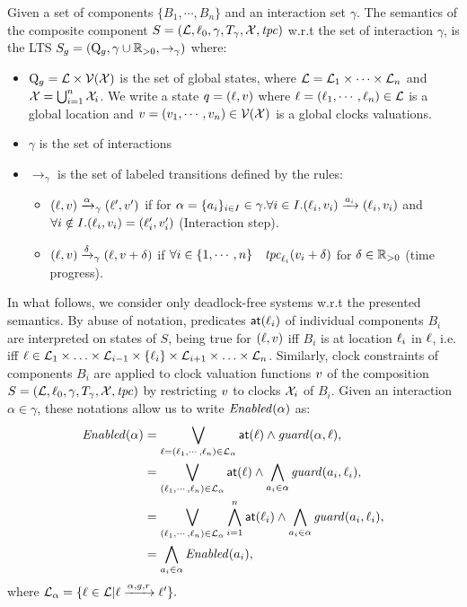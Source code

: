 \begin{property}
  \label{pt:comp_sem}
  Given a set of components $\{B_1,\cdots,B_n\}$ and an interaction set $\gamma$.
The semantics of the composite component $S = (\mathcal{L},\ell_0,\gamma,T_{\gamma},\mathcal{X},\mathit{tpc})$ w.r.t the set of interaction 
$\gamma$, is the LTS $S_g=(\mathrm{Q}_g,\gamma\cup\mathbb R_{> 0},\to_{\gamma})$ where:
\begin{itemize}
  \item $\mathrm{Q}_g=\mathcal{L}\times\mathcal{V}(\mathcal{X})$ is the set of global states, where $\mathcal{L}=\mathcal{L}_1\times
  \cdots\times\mathcal{L}_n$ and $\mathcal{X}=\bigcup^n_{i=1}\mathcal{X}_i$. We write a state $q=(\ell,v)$
  where $\ell=(\ell_1,\cdots,\ell_n)\in\mathcal{L}$ is a global location and $v=(v_1,
  \cdots,v_n)\in\mathcal{V}(\mathcal{X})$ is a global clocks valuations.
  \item $\gamma$ is the set of interactions
  \item $\to_{\gamma}$ is the set of labeled transitions defined by the rules: 
  \begin{itemize}
    \item $(\ell,v)\xrightarrow{\alpha}_{\gamma}(\ell',v')$ if for $\alpha=\{a_i\}_{i\in I}\in\gamma.
      \forall i\in I.(\ell_i,v_i)\xrightarrow{a_i}(\ell_i,v_i)$ and $\forall i \notin I.(\ell_i,v_i)=(\ell_i',v'_i)$
      (Interaction step).
        \item $(\ell,v)\xrightarrow{\delta}_{\gamma}(\ell,v+\delta)$ if
          $\forall i\in\{1,\cdots,n\}\quad \mathit{tpc}_{\ell_i}(v_i+\delta)$ for $\delta\in\mathbb R_{> 0}$ (time progress).
      \end{itemize}
  \end{itemize}
\end{property}

In what follows, we consider only deadlock-free systems w.r.t the presented semantics.
By abuse of notation, predicates $\textnormal{\textsf{at}}(\ell_i)$ of individual components $B_i$ are interpreted on states of $S$,
being true for $(\ell,v)$ iff $B_i$ is at location $\ell_i$ in $\ell$, i.e. iff $\ell\in
\mathcal{L}_1\times\ldots\times\mathcal{L}_{i-1}\times\{\ell_i\}\times\mathcal{L}_{i+1}\times\ldots\times\mathcal{L}_n$.
Similarly, clock constraints of components $B_i$ are applied to clock valuation functions $v$ 
of the composition $S= (\mathcal{L},\ell_0,\gamma,T_{\gamma},\mathcal{X},\mathit{tpc})$ by restricting $v$ to clocks $\mathcal{X}_i$ of $B_i$.
Given an interaction $\alpha\in\gamma$, these notations allow us to write $\mathit{Enabled}(\alpha)$ as:
\begin{align*}
  \mathit{Enabled}(\alpha) &= \bigvee_{\ell=(\ell_1,\cdots,\ell_n)\in\mathcal{L}_{\alpha}} \textnormal{\textsf{at}}(\ell)\wedge \mathit{guard}(\alpha,\ell),\\
                   &= \bigvee_{(\ell_1,\cdots,\ell_n)\in\mathcal{L}_{\alpha}} \textnormal{\textsf{at}}(\ell)\wedge \bigwedge_{a_i\in\alpha}\mathit{guard}(a_i,\ell_i),\\
                   &= \bigvee_{(\ell_1,\cdots,\ell_n)\in\mathcal{L}_{\alpha}} \bigwedge_{i=1}^n\textnormal{\textsf{at}}(\ell_i)\wedge \bigwedge_{a_i\in\alpha}\mathit{guard}(a_i,\ell_i),\\
                   &= \bigwedge_{a_i\in\alpha} \mathit{Enabled}(a_i),
\end{align*}
where $\mathcal{L}_{\alpha}=\{\ell\in\mathcal{L}|\ell\xrightarrow{\alpha,g,r}\ell'\}.$


